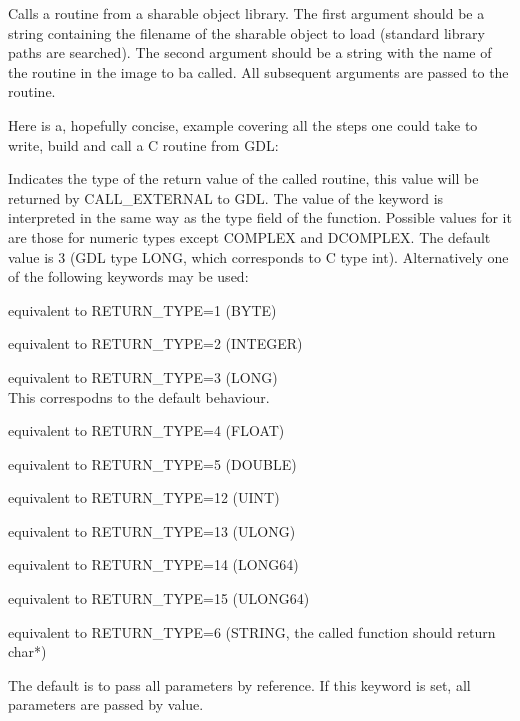 Calls a routine from a sharable object library.
The first argument should be a string containing the filename of the 
sharable object to load (standard library paths are searched).
The second argument should be a string with the name of the routine 
in the image to ba called.
All subsequent arguments are passed to the routine.

Here is a, hopefully concise, example covering all the steps
one could take to write, build and call a C routine from GDL:

Indicates the type of the return value of the called
routine, this value will be returned by CALL\_EXTERNAL to GDL.
The value of the keyword is interpreted in the same way as the type
field of the  function. Possible values for it are those for numeric
types except COMPLEX and DCOMPLEX.
The default value is 3 (GDL type LONG, which corresponds to C type int).
Alternatively one of the following keywords may be used:

equivalent to RETURN\_TYPE=1  (BYTE)

equivalent to RETURN\_TYPE=2  (INTEGER)

equivalent to RETURN\_TYPE=3  (LONG)\\
This correspodns to the default behaviour. 

equivalent to RETURN\_TYPE=4  (FLOAT)

equivalent to RETURN\_TYPE=5  (DOUBLE)

equivalent to RETURN\_TYPE=12 (UINT)

equivalent to RETURN\_TYPE=13 (ULONG)

equivalent to RETURN\_TYPE=14 (LONG64)

equivalent to RETURN\_TYPE=15 (ULONG64)

equivalent to RETURN\_TYPE=6  (STRING, the called function should return char*)

The default is to pass all parameters by reference.
If this keyword is set, all parameters are passed by value.

